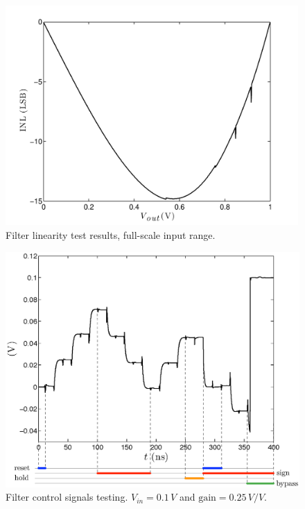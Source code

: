 \begin{figure}[!t]
	\centering
	\includegraphics[width=4.4in]{./Test/linearity.pdf}
	\caption{Filter linearity test results, full-scale input range.}\label{fig:gain_curves}
\end{figure}


\begin{figure}[!t]
	\centering
	\includegraphics[width=5in]{./Test/test_filter_after_omni.eps}
	\caption{Filter control signals testing. $V_\textit{in}=0.1\,V$ and $\text{gain}=0.25\,V/V$.}\label{fig:test_filter_after_omni}
\end{figure}




